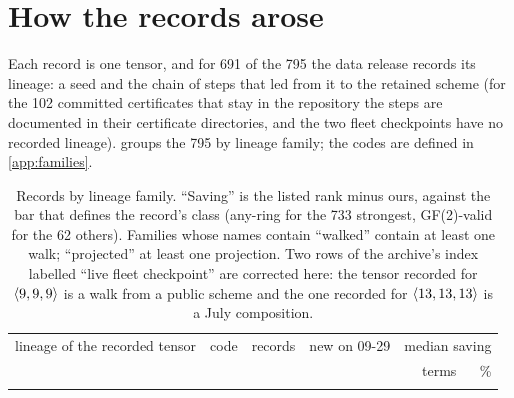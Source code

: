 \section{How the records arose}\label{sec:nature}

Each record is one tensor, and for 691 of the 795 the data release records its lineage: a seed and the chain of steps that led from it to the retained scheme (for the 102 committed certificates that stay in the repository the steps are documented in their certificate directories, and the two fleet checkpoints have no recorded lineage).  groups the 795 by lineage family; the codes are defined in \cref{app:families}.

\begin{table}[t]
\centering\small
\begin{tabular}{@{}p{7.4cm}lrrrr@{}}
\toprule
lineage of the recorded tensor & code & records & new on 09-29 & \multicolumn{2}{c}{median saving}\\
& & & & terms & \%\\
\midrule
\\
\bottomrule
\end{tabular}
\caption{Records by lineage family. ``Saving'' is the listed rank minus ours, against the bar that defines the record's class (any-ring for the 733 strongest, GF(2)-valid for the 62 others). Families whose names contain ``walked'' contain at least one walk; ``projected'' at least one projection. Two rows of the archive's index labelled ``live fleet checkpoint'' are corrected here: the tensor recorded for $\langle 9,9,9\rangle$ is a walk from a public scheme and the one recorded for $\langle 13,13,13\rangle$ is a July composition.}
\label{tab:families}
\end{table}

